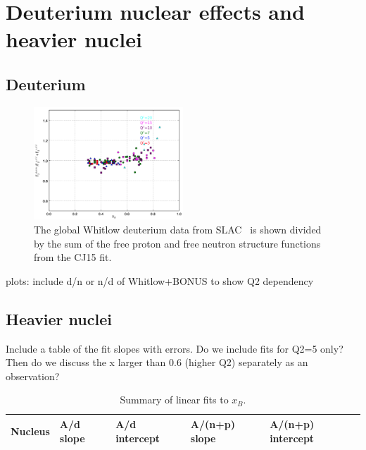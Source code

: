 \documentclass[oneside]{article}
\begin{document}
 
\section{Deuterium nuclear effects and heavier nuclei}

\subsection{Deuterium}

\begin{figure}[H]
  \centering
      	  \includegraphics[width=0.5\textwidth]{plots/deuterium_q2.png}
 	 \caption[Deuterium data from SLAC]{The global Whitlow deuterium data from SLAC~\cite{XS_d} is shown divided by the sum of the free proton and free neutron structure functions from the CJ15 fit.}
  \label{fig:d2_q2}
 \end{figure}

plots: include d/n or n/d of Whitlow+BONUS to show Q2 dependency

\subsection{Heavier nuclei}

Include a table of the fit slopes with errors. Do we include fits for Q2=5 only? Then do we discuss the x larger than 0.6 (higher Q2) separately as an observation?

\begin{table}[htb!]
\caption{\label{SlopeFits} Summary of linear fits to $x_B$.}
\centering
\begin{tabular}{ | C{2.5cm} | C{2cm} | C{2cm} | C{2cm} | C{2cm} | }
 \hline
 \textbf{Nucleus} & \textbf{A/d slope} & \textbf{A/d intercept} & \textbf{A/(n+p) slope} & \textbf{A/(n+p) intercept} \\ 
  \hline
  \hline
    \end{tabular}
\end{table} 
\end{document}
